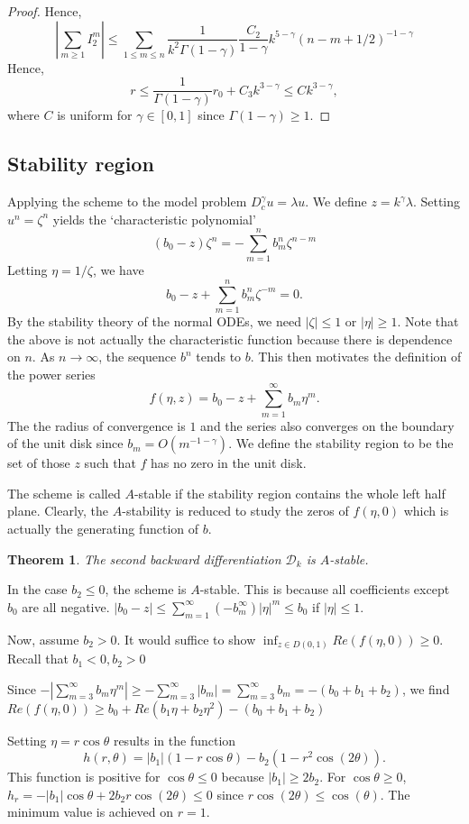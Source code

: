 \documentclass[11pt]{article}
\newtheorem{thm}{Theorem}
\begin{document}
\begin{proof}
Hence,  $$
|\sum_{m\ge 1}I_2^m|\le\sum_{1\le m\le n}\frac{1}{k^2\Gamma(1-\gamma)} \frac{C_2}{1-\gamma}k^{5-\gamma}(n-m+1/2)^{-1-\gamma}
$$
Hence, $$
r\le \frac{1}{\Gamma(1-\gamma)}r_0+C_3k^{3-\gamma}\le Ck^{3-\gamma},
$$
where $C$ is uniform for $\gamma\in [0,1]$ since $\Gamma(1-\gamma)\ge 1$.
\end{proof}

\subsection{Stability region}
Applying the scheme to the model problem $D_c^{\gamma}u=\lambda u$. We define $z=k^{\gamma}\lambda$. Setting $u^n=\zeta^n$ yields the `characteristic polynomial' $$
(b_0-z)\zeta^n=-\sum_{m=1}^n b_m^n \zeta^{n-m}
$$
Letting $\eta=1/\zeta$, we have $$
b_0-z+\sum_{m=1}^n b_m^n\zeta^{-m}=0.
$$
By the stability theory of the normal ODEs, we need $|\zeta|\le 1$ or $|\eta|\ge 1$. Note that the above is not actually the characteristic function because there is dependence on $n$. As $n\to\infty$, the sequence $b^n$ tends to $b$. This then motivates the definition of the power series $$
f(\eta, z)=b_0-z+\sum_{m=1}^{\infty} b_m\eta^m.
$$
The the radius of convergence is $1$ and the series also converges on the boundary of the unit disk since $b_m=O(m^{-1-\gamma})$. We define the stability region to be the set of those $z$ such that $f$ has no zero in the unit disk.

The scheme is called $A$-stable if the stability region contains the whole left half plane. Clearly, the $A$-stability is reduced to study the zeros of $f(\eta, 0)$ which is actually the generating function of $b$.
\begin{thm}
The second backward differentiation $\mathcal{D}_k$ is $A$-stable. 
\end{thm}

 In the case $b_2\le 0$, the scheme is $A$-stable. This is because all coefficients except $b_0$ are all negative. $|b_0-z|\le \sum_{m=1}^{\infty}(-b_m^{\infty})|\eta|^m\le b_0$
if $|\eta|\le 1$. 

Now, assume $b_2>0$. It would suffice to show $\inf_{z\in D(0,1)}Re(f(\eta, 0))\ge 0$. Recall that $b_1<0, b_2>0$

Since $-|\sum_{m=3}^{\infty}b_m\eta^m|\ge -\sum_{m=3}^{\infty}|b_m|
=\sum_{m=3}^{\infty}b_m=-(b_0+b_1+b_2)$, we find 
 $Re(f(\eta,0))\ge b_0+Re(b_1\eta+b_2\eta^2)-(b_0+b_1+b_2)$

Setting $\eta=r\cos\theta$ results in the function $$
h(r,\theta)=|b_1|(1-r\cos\theta)-b_2(1-r^2\cos(2\theta)).
$$
This function is positive for $\cos\theta\le 0$ because $|b_1|\ge 2b_2$. For $\cos\theta\ge 0$, $h_r=-|b_1|\cos\theta+2b_2r\cos(2\theta)\le 0$ since $r\cos(2\theta)\le\cos(\theta)$. The minimum value is achieved on $r=1$. 
\end{document}

